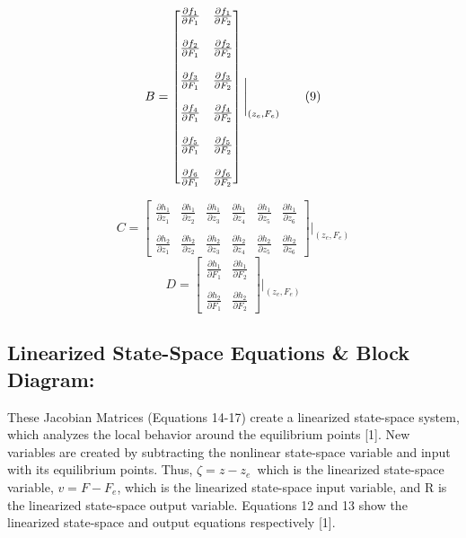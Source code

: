 \documentclass[conference]{IEEEtran}
\begin{document}
\[
\vspace{-2mm}
B = 
\begin{bmatrix}
\frac{\partial f_1}{\partial F_1}&\frac{\partial f_1}{\partial F_2} \\\\
\frac{\partial f_2}{\partial F_1}&\frac{\partial f_2}{\partial F_2} \\\\
\frac{\partial f_3}{\partial F_1}&\frac{\partial f_3}{\partial F_2} \\\\
\frac{\partial f_4}{\partial F_1}&\frac{\partial f_4}{\partial F_2} \\\\
\frac{\partial f_5}{\partial F_1}&\frac{\partial f_5}{\partial F_2}\\\\
\frac{\partial f_6}{\partial F_1}&\frac{\partial f_6}{\partial F_2}
\end{bmatrix}
\Bigg|_{(z_e,F_e)} 
\tag{9}
\] 

\[
C = 
\begin{bmatrix}
\frac{\partial h_1}{\partial z_1}&\frac{\partial h_1}{\partial z_2}& \frac{\partial h_1}{\partial z_3}& \frac{\partial h_1}{\partial z_4}& \frac{\partial h_1}{\partial z_5} &\frac{\partial h_1}{\partial z_6}\\\\
\frac{\partial h_2}{\partial z_1}&\frac{\partial h_2}{\partial z_2}& \frac{\partial h_2}{\partial z_3}& \frac{\partial h_2}{\partial z_4}& \frac{\partial h_2}{\partial z_5} &\frac{\partial h_2}{\partial z_6}
\end{bmatrix}
\Bigg|_{(z_e,F_e)} 
\tag{10}
\] 
\[
D =
\begin{bmatrix}
\frac{\partial h_1}{\partial F_1}&\frac{\partial h_1}{\partial F_2} \\\\
\frac{\partial h_2}{\partial F_1}&\frac{\partial h_2}{\partial F_2}
\end{bmatrix}
\Bigg|_{(z_e,F_e)} 
\tag{11}
\] 

\subsection{Linearized State-Space Equations \& Block Diagram:}
These Jacobian Matrices (Equations 14-17) create a linearized state-space system, which analyzes the local behavior around the equilibrium points [1]. New variables are created by subtracting the nonlinear state-space variable and input with its equilibrium points. Thus, $\zeta = z - z_e$\, which is the linearized state-space variable, $v = F - F_e$, which is the linearized state-space input variable, and R is the linearized state-space output variable. Equations 12 and 13 show the linearized state-space and output equations respectively [1].
\end{document}
